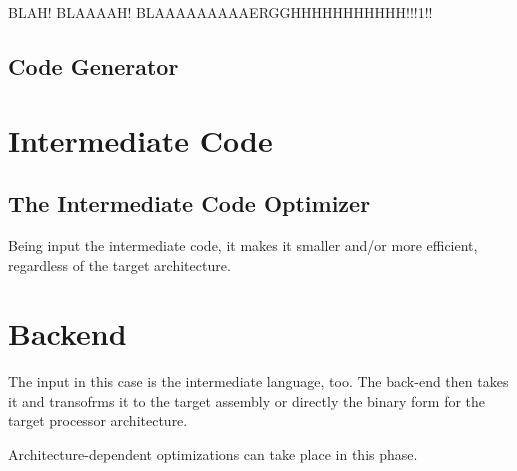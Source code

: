             \begin{center}\end{center}

            BLAH! BLAAAAH! BLAAAAAAAAAERGGHHHHHHHHHHH!!!1!!

        \subsection{Code Generator}


    \section{Intermediate Code}

        \subsection{The Intermediate Code Optimizer}

            Being input the intermediate code, it makes it smaller and/or more efficient, regardless of the target architecture.

    \section{Back\-end}

        The input in this case is the intermediate language, too. The back-end then takes it and transofrms it to the target assembly or directly the binary form for the target processor architecture.

        Architecture-dependent optimizations can take place in this phase.

